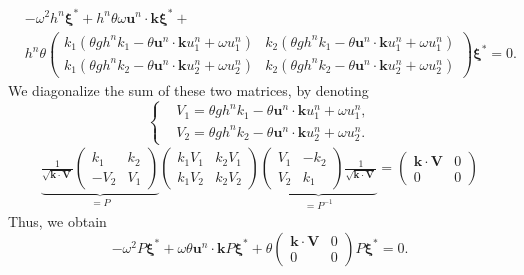 \documentclass[a4paper, 11pt]{article}
\begin{document}
\begin{equation*}
\begin{split}
&-\omega^2h^n\boldsymbol{\xi}^*+h^n\theta\omega \boldsymbol{u}^n\cdot \boldsymbol{k}\boldsymbol{\xi}^*+\\
&h^n\theta\begin{pmatrix}k_1(\theta gh^nk_1-\theta \boldsymbol{u}^n\cdot \boldsymbol{k}u_1^n+\omega u_1^n)&k_2(\theta gh^nk_1-\theta \boldsymbol{u}^n\cdot \boldsymbol{k}u_1^n+\omega u_1^n)\\
k_1(\theta gh^nk_2-\theta \boldsymbol{u}^n\cdot \boldsymbol{k}u_2^n+\omega u_2^n)&k_2(\theta gh^nk_2-\theta \boldsymbol{u}^n\cdot \boldsymbol{k}u_2^n+\omega u_2^n)\end{pmatrix}\boldsymbol{\xi}^*=0.
\end{split}
\end{equation*}
We diagonalize the sum of these two matrices, by denoting \begin{equation*}
\left\{\begin{split}
&V_1=\theta gh^nk_1-\theta \boldsymbol{u}^n\cdot \boldsymbol{k}u_1^n+\omega u_1^n,\\
&V_2=\theta gh^nk_2-\theta \boldsymbol{u}^n\cdot \boldsymbol{k}u_2^n+\omega u_2^n.
\end{split}\right.
\end{equation*}
\begin{equation*}
\begin{split}
\underbrace{\frac{1}{\sqrt{\boldsymbol{k}\cdot \boldsymbol{V}}}
\begin{pmatrix}
k_1&k_2\\-V_2&V_1
\end{pmatrix}}_{=P}\begin{pmatrix}k_1V_1&k_2V_1\\k_1V_2&k_2V_2\end{pmatrix}\underbrace{\begin{pmatrix}V_1&-k_2\\V_2&k_1\end{pmatrix}\frac{1}{\sqrt{\boldsymbol{k}\cdot \boldsymbol{V}}}}_{=P^{-1}}=\begin{pmatrix}\boldsymbol{k}\cdot \boldsymbol{V}&0\\0&0\end{pmatrix}
\end{split}
\end{equation*}
Thus, we obtain
\begin{equation*}
-\omega^2P\boldsymbol{\xi}^*+\omega\theta \boldsymbol{u}^n\cdot \boldsymbol{k}P\boldsymbol{\xi}^*+\theta\begin{pmatrix}\boldsymbol{k}\cdot \boldsymbol{V}&0\\0&0\end{pmatrix}P\boldsymbol{\xi}^*=0.
\end{equation*}
\end{document}
